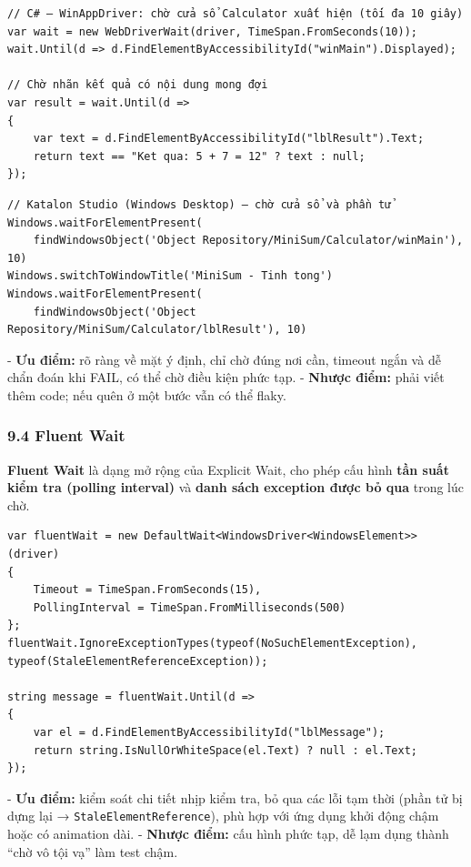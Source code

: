 \begin{lstlisting}
// C# – WinAppDriver: chờ cửa sổ Calculator xuất hiện (tối đa 10 giây)
var wait = new WebDriverWait(driver, TimeSpan.FromSeconds(10));
wait.Until(d => d.FindElementByAccessibilityId("winMain").Displayed);

// Chờ nhãn kết quả có nội dung mong đợi
var result = wait.Until(d =>
{
    var text = d.FindElementByAccessibilityId("lblResult").Text;
    return text == "Ket qua: 5 + 7 = 12" ? text : null;
});
\end{lstlisting}


\begin{lstlisting}
// Katalon Studio (Windows Desktop) – chờ cửa sổ và phần tử
Windows.waitForElementPresent(
    findWindowsObject('Object Repository/MiniSum/Calculator/winMain'), 10)
Windows.switchToWindowTitle('MiniSum - Tinh tong')
Windows.waitForElementPresent(
    findWindowsObject('Object Repository/MiniSum/Calculator/lblResult'), 10)
\end{lstlisting}


- \textbf{Ưu điểm:} rõ ràng về mặt ý định, chỉ chờ đúng nơi cần, timeout ngắn và dễ chẩn đoán khi FAIL, có thể chờ điều kiện phức tạp.
- \textbf{Nhược điểm:} phải viết thêm code; nếu quên ở một bước vẫn có thể flaky.

\subsubsection{9.4 Fluent Wait}

\textbf{Fluent Wait} là dạng mở rộng của Explicit Wait, cho phép cấu hình \textbf{tần suất kiểm tra (polling interval)} và \textbf{danh sách exception được bỏ qua} trong lúc chờ.

\begin{lstlisting}
var fluentWait = new DefaultWait<WindowsDriver<WindowsElement>>(driver)
{
    Timeout = TimeSpan.FromSeconds(15),
    PollingInterval = TimeSpan.FromMilliseconds(500)
};
fluentWait.IgnoreExceptionTypes(typeof(NoSuchElementException), typeof(StaleElementReferenceException));

string message = fluentWait.Until(d =>
{
    var el = d.FindElementByAccessibilityId("lblMessage");
    return string.IsNullOrWhiteSpace(el.Text) ? null : el.Text;
});
\end{lstlisting}


- \textbf{Ưu điểm:} kiểm soát chi tiết nhịp kiểm tra, bỏ qua các lỗi tạm thời (phần tử bị dựng lại → \texttt{StaleElementReference}), phù hợp với ứng dụng khởi động chậm hoặc có animation dài.
- \textbf{Nhược điểm:} cấu hình phức tạp, dễ lạm dụng thành “chờ vô tội vạ” làm test chậm.

